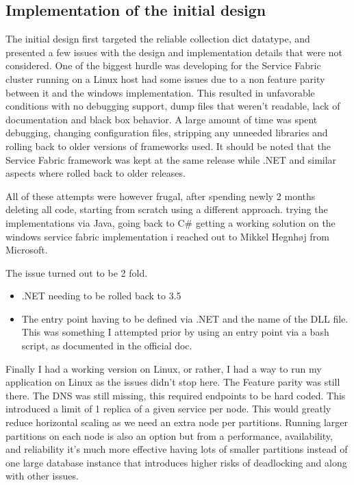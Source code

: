 \documentclass[a4paper,10pt,titlepage]{report}
\begin{document}
  

    \subsection{Implementation of the initial design}

    The initial design first targeted the reliable collection dict datatype, and presented a few issues with the design and implementation details that were not considered. One of the biggest hurdle was developing for the Service Fabric cluster running on a Linux host had some issues due to a non feature parity between it and the windows implementation. This resulted in unfavorable conditions with no debugging support, dump files that weren't readable, lack of documentation and black box behavior. 
A large amount of time was spent debugging, changing configuration files, stripping any unneeded libraries and rolling back to older versions of frameworks used. It should be noted that the Service Fabric framework was kept at the same release while .NET and similar aspects where rolled back to older releases.

    All of these attempts were however frugal, after spending newly 2 months deleting all code, starting from scratch using a different approach. trying the implementations via Java, going back to C\# getting a working solution on the windows service fabric implementation i reached out to Mikkel Hegnhøj from Microsoft.

    The issue turned out to be 2 fold.
    \begin{itemize}
        \item .NET needing to be rolled back to 3.5
        \item The entry point having to be defined via .NET and the name of the DLL file. This was something I attempted prior by using an entry point via a bash script, as documented in the official doc. 
        
        \end{itemize}

    Finally I had a working version on Linux, or rather, I had a way to run my application on Linux as the issues didn't stop here. The Feature parity was still there. The DNS was still missing, this required endpoints to be hard coded. This introduced a limit of 1 replica of a given service per node. This would greatly reduce horizontal scaling as we need an extra node per partitions. Running larger partitions on each node is also an option but from a performance, availability, and reliability it's much more effective having lots of smaller partitions instead of one large database instance that introduces higher risks of deadlocking and along with other issues.
\end{document}
